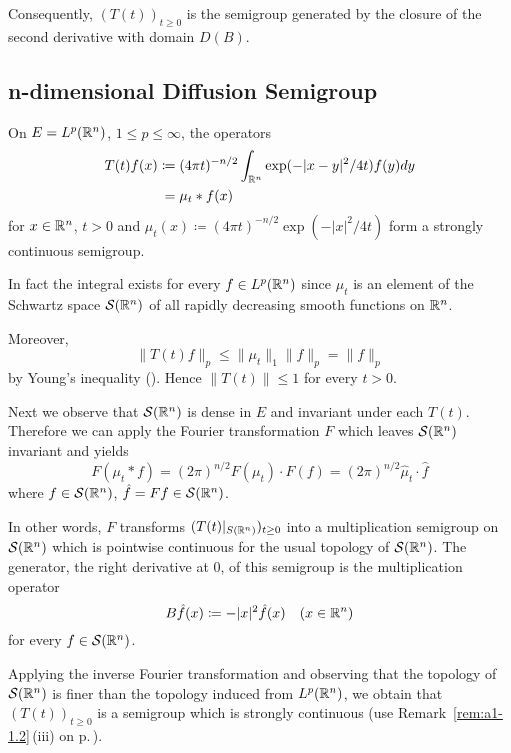 Consequently, $(T(t))_{t \geq 0}$ is the semigroup generated by the closure of the second derivative with domain $D(B)$.
\subsection{n-dimensional Diffusion Semigroup}\label{subsec:a1-2.8}%
On $E = L^{p}(\mathbb{R}^{n})$, $1 \leq p \leq \infty$, the operators
\begin{align*}
    T(t)f(x) \coloneqq{}& (4\pi t)^{-n/2} \int_{\mathbb{R}^{n}} \exp(-|x-y|^{2}/4t)f(y)dy \\
    ={}& \mu_{t}*f(x)
\end{align*}
for $x \in \mathbb{R}^{n}$, $t > 0$ and $\mu_{t}(x) \coloneqq (4\pi t)^{-n/2} \exp(-|x|^{2}/4t)$ form a strongly continuous semigroup.

In fact the integral exists for every $f \in L^{p}(\mathbb{R}^{n})$ since $\mu_{t}$ is an element of the Schwartz space $\mathcal{S}(\mathbb{R}^{n})$ of all rapidly decreasing smooth functions on $\mathbb{R}^{n}$.

Moreover,
\[
    \|T(t)f\|_{p} \leq \|\mu_{t}\|_{1}\|f\|_{p} = \|f\|_{p}
\]
by Young's inequality (\citet[p.28]{reedsimon:1975}). Hence $\|T(t)\| \leq 1$ for every $t > 0$.

Next we observe that $\mathcal{S}(\mathbb{R}^{n})$ is dense in $E$ and invariant under each $T(t)$.
Therefore we can apply the Fourier transformation $F$ which leaves $\mathcal{S}(\mathbb{R}^{n})$ invariant and yields
\[
    F(\mu_{t}*f) = (2\pi)^{n/2} F(\mu_{t}) \cdot F(f) = (2\pi)^{n/2} \hat{\mu}_{t}\cdot\hat{f}
\]
where $f \in \mathcal{S}(\mathbb{R}^{n})$, $\hat{f} = Ff \in \mathcal{S}(\mathbb{R}^{n})$.

In other words, $F$ transforms $(T(t)\vert_{ S(\mathbb{R}^{n})})_{t \geq 0}$ into a multiplication semigroup on $\mathcal{S}(\mathbb{R}^{n})$ which is pointwise continuous for the usual topology of $\mathcal{S}(\mathbb{R}^{n})$.
The generator, \ie the right derivative at $0$, of this semigroup is the multiplication operator
\[
    B\hat{f}(x) \coloneqq -|x|^{2}\hat{f}(x) \quad (x \in \mathbb{R}^{n})
\]
for every $f \in \mathcal{S}(\mathbb{R}^{n})$.

Applying the inverse Fourier transformation and observing that the topology of $\mathcal{S}(\mathbb{R}^{n})$ is finer than the topology induced from $L^{p}(\mathbb{R}^{n})$, we obtain that $(T(t))_{t \geq 0}$ is a semigroup which is strongly continuous (use Remark~\ref{rem:a1-1.2}\,(iii) on p.\,\pageref{rem:a1-1.2}).

